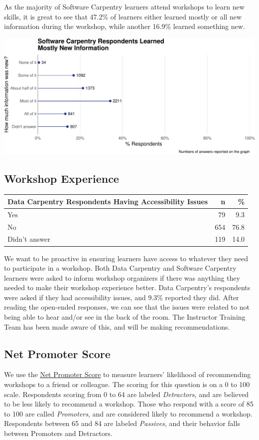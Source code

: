 \documentclass[]{article}
\makeatletter
\def\maxwidth{\ifdim\Gin@nat@width>\linewidth\linewidth\else\Gin@nat@width\fi}
\makeatother
\begin{document}
As the majority of Software Carpentry learners attend workshops to learn
new skills, it is great to see that 47.2\% of learners either learned
mostly or all new information during the workshop, while another 16.9\%
learned something new.

\includegraphics[width=\maxwidth]{../figures/swc-new-information-plot-1}

\subsection{Workshop Experience}\label{workshop-experience}

\begin{longtable}[]{@{}lrr@{}}
\toprule
Data Carpentry Respondents Having Accessibility Issues & n &
\%\tabularnewline
\midrule
\endhead
Yes & 79 & 9.3\tabularnewline
No & 654 & 76.8\tabularnewline
Didn't answer & 119 & 14.0\tabularnewline
\bottomrule
\end{longtable}

We want to be proactive in ensuring learners have access to whatever
they need to participate in a workshop. Both Data Carpentry and Software
Carpentry learners were asked to inform workshop organizers if there was
anything they needed to make their workshop experience better. Data
Carpentry's respondents were asked if they had accessibility issues, and
9.3\% reported they did. After reading the open-ended responses, we can
see that the issues were related to not being able to hear and/or see in
the back of the room. The Instructor Training Team has been made aware
of this, and will be making recommendations.

\subsection{Net Promoter Score}\label{net-promoter-score}

We use the \href{https://en.wikipedia.org/wiki/Net_Promoter}{Net
Promoter Score} to measure learners' likelihood of recommending
workshops to a friend or colleague. The scoring for this question is on
a 0 to 100 scale. Respondents scoring from 0 to 64 are labeled
\emph{Detractors}, and are believed to be less likely to recommend a
workshop. Those who respond with a score of 85 to 100 are called
\emph{Promoters}, and are considered likely to recommend a workshop.
Respondents between 65 and 84 are labeled \emph{Passives}, and their
behavior falls between Promoters and Detractors.
\end{document}

